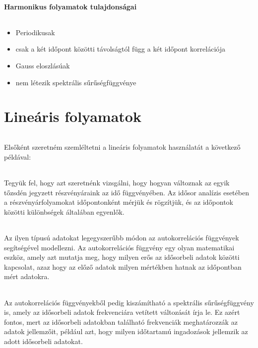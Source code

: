 \documentclass[11pt,a4pape,draftr]{article}
\begin{document}
			\subsection{Harmonikus folyamatok tulajdonságai}
				\paragraph{}
					\begin{itemize}
						\item Periodikusak
						\item csak a két időpont közötti távolságtól függ a két időpont korrelációja
						\item Gauss eloszlásúak
						\item nem létezik spektrális sűrűségfüggvénye
					\end{itemize}
		\part{Lineáris folyamatok}
			\paragraph{}
				Elsőként szeretném szemléltetni a lineáris folyamatok használatát a következő példával:
			\paragraph{}
				Tegyük fel, hogy azt szeretnénk vizsgálni, hogy hogyan változnak az egyik tőzsdén jegyzett részvényáraink az idő függvényében. Az idősor analízis esetében a részvényárfolyamokat időpontonként mérjük és rögzítjük, és az időpontok közötti különbségek általában egyenlők.
			\paragraph{}
				Az ilyen típusú adatokat legegyszerűbb módon az autokorrelációs függvények segítségével modellezni. Az autokorrelációs függvény egy olyan matematikai eszköz, amely azt mutatja meg, hogy milyen erős az idősorbeli adatok közötti kapcsolat, azaz hogy az előző adatok milyen mértékben hatnak az időpontban mért adatokra.
			\paragraph{}
				Az autokorrelációs függvényekből pedig kiszámítható a spektrális sűrűségfüggvény is, amely az idősorbeli adatok frekvenciára vetített változását írja le. Ez azért fontos, mert az idősorbeli adatokban található frekvenciák meghatározzák az adatok jellemzőit, például azt, hogy milyen időtartamú ingadozások jellemzik az adott idősorbeli adatokat.
\end{document}
